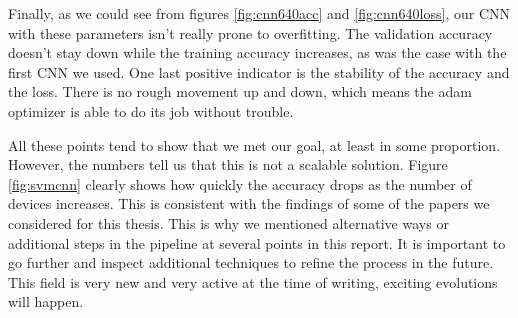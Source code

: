 Finally, as we could see from figures \ref{fig:cnn640acc} and \ref{fig:cnn640loss}, our CNN with these parameters isn't really prone to overfitting. The validation accuracy doesn't stay down while the training accuracy increases, as was the case with the first CNN we used. One last positive indicator is the stability of the accuracy and the loss. There is no rough movement up and down, which means the adam optimizer is able to do its job without trouble.

All these points tend to show that we met our goal, at least in some proportion. However, the numbers tell us that this is not a scalable solution. Figure \ref{fig:svmcnn} clearly shows how quickly the accuracy drops as the number of devices increases. This is consistent with the findings of some of the papers we considered for this thesis. This is why we mentioned alternative ways or additional steps in the pipeline at several points in this report. It is important to go further and inspect additional techniques to refine the process in the future. This field is very new and very active at the time of writing, exciting evolutions will happen.
